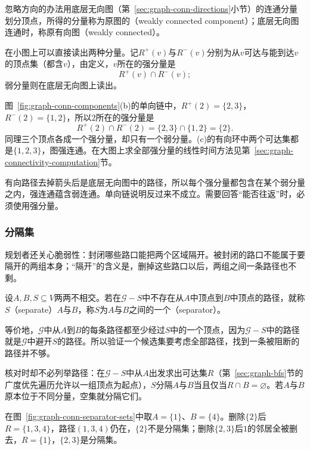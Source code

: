 忽略方向的办法用底层无向图（第~\ref{sec:graph-conn-directions}小节）的连通分量划分顶点，所得的分量称为原图的（weakly connected component）；底层无向图连通时，称原有向图（weakly connected）。

在小图上可以直接读出两种分量。记$R^+(v)$与$R^-(v)$分别为从$v$可达与能到达$v$的顶点集（都含$v$），由定义，$v$所在的强分量是
\[
R^+(v)\cap R^-(v);
\]
弱分量则在底层无向图上读出。

图~\ref{fig:graph-conn-components}(b)的单向链中，$R^+(2)=\{2,3\}$，$R^-(2)=\{1,2\}$，所以$2$所在的强分量是
\[
R^+(2)\cap R^-(2)=\{2,3\}\cap\{1,2\}=\{2\}.
\]
同理三个顶点各成一个强分量，却只有一个弱分量。(c)的有向环中两个可达集都是$\{1,2,3\}$，图强连通。在大图上求全部强分量的线性时间方法见第~\ref{sec:graph-connectivity-computation}节。

有向路径去掉箭头后是底层无向图中的路径，所以每个强分量都包含在某个弱分量之内，强连通蕴含弱连通。单向链说明反过来不成立。需要回答“能否往返”时，必须使用强分量。

\subsubsection{分隔集}
\label{sec:graph-conn-separators}

规划者还关心脆弱性：封闭哪些路口能把两个区域隔开。被封闭的路口不能属于要隔开的两组本身；“隔开”的含义是，删掉这些路口以后，两组之间一条路径也不剩。

\begin{definition}[分隔]
\label{def:graph-conn-separation}
设$A,B,S\subseteq V$两两不相交。若在$\mathcal G-S$中不存在从$A$中顶点到$B$中顶点的路径，就称$S$（separate）$A$与$B$，称$S$为$A$与$B$之间的一个（separator）。
\end{definition}

等价地，$\mathcal G$中从$A$到$B$的每条路径都至少经过$S$中的一个顶点，因为$\mathcal G-S$中的路径就是$\mathcal G$中避开$S$的路径。所以验证一个候选集要考虑全部路径，找到一条被阻断的路径并不够。

核对时却不必列举路径：在$\mathcal G-S$中从$A$出发求出可达集$R$（第~\ref{sec:graph-bfs}节的广度优先遍历允许以一组顶点为起点），$S$分隔$A$与$B$当且仅当$R\cap B=\varnothing$。若$A$与$B$原本位于不同分量，空集就分隔它们。

在图~\ref{fig:graph-conn-separator-sets}中取$A=\{1\}$、$B=\{4\}$。删除$\{2\}$后$R=\{1,3,4\}$，路径$(1,3,4)$仍在，$\{2\}$不是分隔集；删除$\{2,3\}$后$1$的邻居全被删去，$R=\{1\}$，$\{2,3\}$是分隔集。

